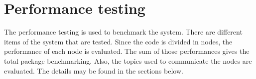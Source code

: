 









\section{Performance testing}
	The performance testing is used to benchmark the system.
	There are different items of the system that are tested. 
	Since the code is divided in nodes, the performance of each node is evaluated. 
	The sum of those performances gives the total package benchmarking. 
	Also, the topics used to communicate the nodes are evaluated. 
	The details may be found in the sections below. 
	\\[0.5cm]

